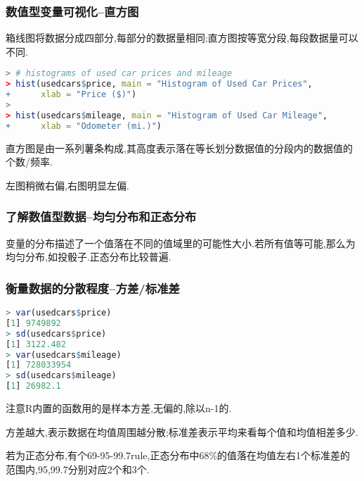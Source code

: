 \documentclass[11pt,a4paper,oneside]{book}
\begin{document}
\subsubsection{数值型变量可视化--直方图}
箱线图将数据分成四部分,每部分的数据量相同;直方图按等宽分段,每段数据量可以不同.
\begin{lstlisting}[language=r]
> # histograms of used car prices and mileage
> hist(usedcars$price, main = "Histogram of Used Car Prices",
+      xlab = "Price ($)")
> 
> hist(usedcars$mileage, main = "Histogram of Used Car Mileage",
+      xlab = "Odometer (mi.)")
\end{lstlisting}
\begin{figure}[H]
	\centering
\end{figure}
直方图是由一系列薯条构成,其高度表示落在等长划分数据值的分段内的数据值的个数/频率.

左图稍微右偏,右图明显左偏.
\subsubsection{了解数值型数据--均匀分布和正态分布}
变量的分布描述了一个值落在不同的值域里的可能性大小.若所有值等可能,那么为均匀分布,如投骰子.正态分布比较普遍.

\subsubsection{衡量数据的分散程度--方差/标准差}
\begin{lstlisting}[language=r]
> var(usedcars$price)
[1] 9749892
> sd(usedcars$price)
[1] 3122.482
> var(usedcars$mileage)
[1] 728033954
> sd(usedcars$mileage)
[1] 26982.1
\end{lstlisting}

\begin{tcolorbox}[colback=pink!10!white,colframe=pink!100!black]
	注意R内置的函数用的是样本方差,无偏的,除以n-1的.
\end{tcolorbox}

方差越大,表示数据在均值周围越分散;标准差表示平均来看每个值和均值相差多少.

若为正态分布,有个69-95-99.7rule,正态分布中68\%的值落在均值左右1个标准差的范围内,95,99.7分别对应2个和3个.
\end{document}
